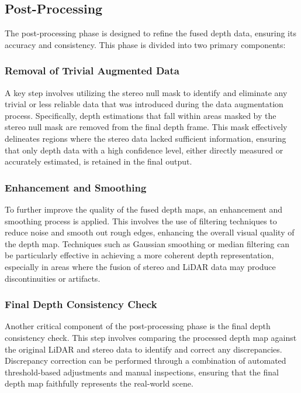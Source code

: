 \documentclass[conference]{IEEEtran}
\begin{document}

\subsection{Post-Processing}

The post-processing phase is designed to refine the fused depth data, ensuring its accuracy and consistency. This phase is divided into two primary components:

\subsubsection{Removal of Trivial Augmented Data}

A key step involves utilizing the stereo null mask to identify and eliminate any trivial or less reliable data that was introduced during the data augmentation process. Specifically, depth estimations that fall within areas masked by the stereo null mask are removed from the final depth frame. This mask effectively delineates regions where the stereo data lacked sufficient information, ensuring that only depth data with a high confidence level, either directly measured or accurately estimated, is retained in the final output.

\subsubsection{Enhancement and Smoothing}

To further improve the quality of the fused depth maps, an enhancement and smoothing process is applied. This involves the use of filtering techniques to reduce noise and smooth out rough edges, enhancing the overall visual quality of the depth map. Techniques such as Gaussian smoothing or median filtering can be particularly effective in achieving a more coherent depth representation, especially in areas where the fusion of stereo and LiDAR data may produce discontinuities or artifacts.

\subsubsection{Final Depth Consistency Check}

Another critical component of the post-processing phase is the final depth consistency check. This step involves comparing the processed depth map against the original LiDAR and stereo data to identify and correct any discrepancies. Discrepancy correction can be performed through a combination of automated threshold-based adjustments and manual inspections, ensuring that the final depth map faithfully represents the real-world scene.
\end{document}
